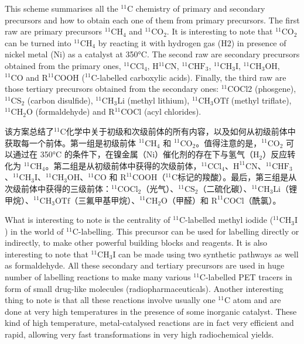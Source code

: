 \documentclass[dvipsnames, svgnames,a4paper,11pt]{article}
\begin{document}
This scheme summarises all the ${}^\mathrm{11}\mathrm{C}$ chemistry of primary and secondary precursors and how to obtain each one of them from primary precursors. The first raw are primary precursors ${}^\mathrm{11}\mathrm{CH_4}$ and ${}^\mathrm{11}\mathrm{CO_2}$. It is interesting to note that ${}^\mathrm{11}\mathrm{CO_2}$ can be turned into ${}^\mathrm{11}\mathrm{CH_4}$ by reacting it with hydrogen gas (H2) in presence of nickel metal (Ni) as a catalyst at 350°C. The second raw are secondary precursors obtained from the primary ones, ${}^\mathrm{11}\mathrm{CCl_4}$, H${}^\mathrm{11}\mathrm{C}$N, ${}^\mathrm{11}\mathrm{CHF_3}$, ${}^\mathrm{11}\mathrm{CH_3I}$, ${}^\mathrm{11}\mathrm{CH_3OH}$, ${}^\mathrm{11}\mathrm{CO}$ and R${}^\mathrm{11}\mathrm{COOH}$ (${}^\mathrm{11}\mathrm{C}$-labelled carboxylic acids). Finally, the third raw are those tertiary precursors obtained from the secondary ones: ${}^\mathrm{11}\mathrm{C}$OCl2 (phosgene), ${}^\mathrm{11}\mathrm{CS_2}$ (carbon disulfide), ${}^\mathrm{11}\mathrm{CH_3Li}$ (methyl lithium), ${}^\mathrm{11}\mathrm{CH_3OTf}$ (methyl triflate), ${}^\mathrm{11}\mathrm{CH_2O}$ (formaldehyde) and R${}^\mathrm{11}\mathrm{C}$OCl (acyl chlorides).

该方案总结了${}^\mathrm{11}\mathrm{C}$化学中关于初级和次级前体的所有内容，以及如何从初级前体中获取每一个前体。第一组是初级前体 $\mathrm{^{11}CH_4}$ 和 $\mathrm{^{11}CO_2}$。值得注意的是，$\mathrm{^{11}CO_2}$ 可以通过在 350°C 的条件下，在镍金属（$\mathrm{Ni}$）催化剂的存在下与氢气（$\mathrm{H_2}$）反应转化为 $\mathrm{^{11}CH_4}$。第二组是从初级前体中获得的次级前体，$\mathrm{^{11}CCl_4}$、$\mathrm{H^{11}CN}$、$\mathrm{^{11}CHF_3}$、$\mathrm{^{11}CH_3I}$、$\mathrm{^{11}CH_3OH}$、$\mathrm{^{11}CO}$ 和 $\mathrm{R^{11}COOH}$（${}^\mathrm{11}\mathrm{C}$标记的羧酸）。最后，第三组是从次级前体中获得的三级前体：$\mathrm{^{11}COCl_2}$（光气）、$\mathrm{^{11}CS_2}$（二硫化碳）、$\mathrm{^{11}CH_3Li}$（锂甲烷）、$\mathrm{^{11}CH_3OTf}$（三氟甲基甲烷）、$\mathrm{^{11}CH_2O}$（甲醛）和 $\mathrm{R^{11}COCl}$（酰氯）。

What is interesting to note is the centrality of ${}^\mathrm{11}\mathrm{C}$-labelled methyl iodide (${}^\mathrm{11}\mathrm{CH_3I}$) in the world of ${}^\mathrm{11}\mathrm{C}$-labelling. This precursor can be used for labelling directly or indirectly, to make other powerful building blocks and reagents. It is also interesting to note that ${}^\mathrm{11}\mathrm{CH_3I}$ can be made using two synthetic pathways as well as formaldehyde. All these secondary and tertiary precursors are used in huge number of labelling reactions to make many various ${}^\mathrm{11}\mathrm{C}$-labelled PET tracers in form of small drug-like molecules (radiopharmaceuticals). Another interesting thing to note is that all these reactions involve usually one ${}^\mathrm{11}\mathrm{C}$ atom and are done at very high temperatures in the presence of some inorganic catalyst. These kind of high temperature, metal-catalysed reactions are in fact very efficient and rapid, allowing very fast transformations in very high radiochemical yields.
\end{document}
